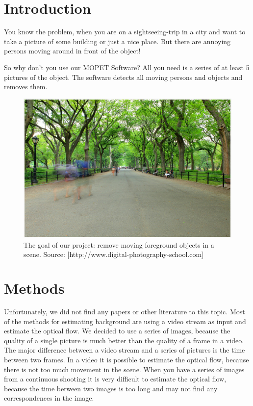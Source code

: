 \chapter{Introduction}

You know the problem, when you are on a sightseeing-trip in a city and want to take a picture of some
building or just a nice place. But there are annoying persons moving around in front
of the object!

So why don't you use our MOPET Software?
All you need is a series of at least 5 pictures of the object. The software 
detects all moving persons and objects and removes them.

\begin{figure}[h!]
 \centering
 \includegraphics[width=\textwidth]{./pics/intro.png}
 \caption{The goal of our project: remove moving foreground objects in a scene.
 Source: [http://www.digital-photography-school.com]}
 \label{fig:intro}
\end{figure}



\chapter{Methods}

Unfortunately, we did not find any papers or other literature to this topic. Most of the methods for estimating
background are using a video stream as input and estimate the optical flow.
We decided to use a series of images,
because the quality of a single picture is much better than the quality of a frame in a video.
The major difference between a video stream and a series of pictures is the time between two frames.
In a video it is possible to estimate the optical flow, because there is not too much movement in the scene.
When you have a series of images from a continuous shooting it is very difficult to estimate the optical flow, because the time between
two images is too long and may not find any correspondences in the image.

